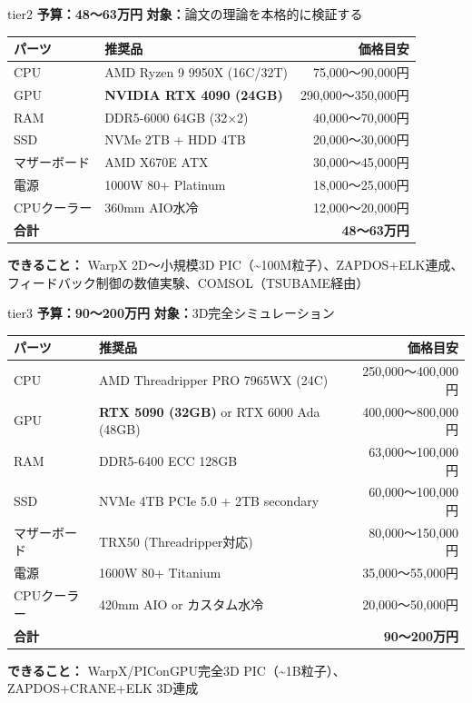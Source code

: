 \documentclass[12pt,a4paper]{ltjsarticle}
\begin{document}
\begin{tierbox}{tier2}
\textbf{予算：48〜63万円} \quad
\textbf{対象：}論文の理論を本格的に検証する

\medskip\centering
\centering\sffamily\small
\begin{tabular}{@{}llr@{}}
\toprule
\textbf{パーツ} & \textbf{推奨品} & \textbf{価格目安} \\
\midrule
CPU & AMD Ryzen 9 9950X (16C/32T) & 75,000〜90,000円 \\
GPU & \textbf{NVIDIA RTX 4090 (24GB)} & 290,000〜350,000円 \\
RAM & DDR5-6000 64GB (32$\times$2) & 40,000〜70,000円 \\
SSD & NVMe 2TB + HDD 4TB & 20,000〜30,000円 \\
マザーボード & AMD X670E ATX & 30,000〜45,000円 \\
電源 & 1000W 80+ Platinum & 18,000〜25,000円 \\
CPUクーラー & 360mm AIO水冷 & 12,000〜20,000円 \\
\midrule
\textbf{合計} & & \textbf{48〜63万円} \\
\bottomrule
\end{tabular}
\medskip

\textbf{できること：}
WarpX 2D〜小規模3D PIC（\textasciitilde 100M粒子）、ZAPDOS+ELK連成、
フィードバック制御の数値実験、COMSOL（TSUBAME経由）
\end{tierbox}

\vspace{0.5cm}

\begin{tierbox}{tier3}
\textbf{予算：90〜200万円} \quad
\textbf{対象：}3D完全シミュレーション

\medskip\centering
\centering\sffamily\small
\begin{tabular}{@{}llr@{}}
\toprule
\textbf{パーツ} & \textbf{推奨品} & \textbf{価格目安} \\
\midrule
CPU & AMD Threadripper PRO 7965WX (24C) & 250,000〜400,000円 \\
GPU & \textbf{RTX 5090 (32GB)} or RTX 6000 Ada (48GB) & 400,000〜800,000円 \\
RAM & DDR5-6400 ECC 128GB & 63,000〜100,000円 \\
SSD & NVMe 4TB PCIe 5.0 + 2TB secondary & 60,000〜100,000円 \\
マザーボード & TRX50 (Threadripper対応) & 80,000〜150,000円 \\
電源 & 1600W 80+ Titanium & 35,000〜55,000円 \\
CPUクーラー & 420mm AIO or カスタム水冷 & 20,000〜50,000円 \\
\midrule
\textbf{合計} & & \textbf{90〜200万円} \\
\bottomrule
\end{tabular}
\medskip

\textbf{できること：}
WarpX/PIConGPU完全3D PIC（\textasciitilde 1B粒子）、ZAPDOS+CRANE+ELK 3D連成
\end{tierbox}
\end{document}
